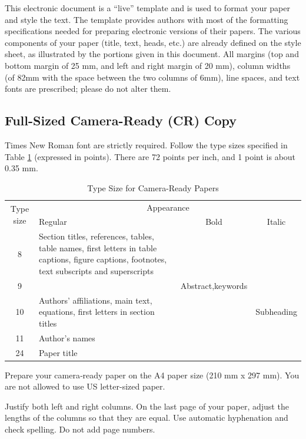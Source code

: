 \documentclass{MIPRO}
\begin{document}
This electronic document is a “live” template and is used to format your paper and style the text. The template provides authors with most of the formatting specifications needed for preparing electronic versions of their papers. The various components of your paper (title, text, heads, etc.) are already defined on the style sheet, as illustrated by the portions given in this document. All margins (top and bottom margin of 25 mm, and left and right margin of 20 mm), column widths (of 82mm with the space between the two columns of 6mm), line spaces, and text fonts are prescribed; please do not alter them.

\subsection{Full-Sized Camera-Ready (CR) Copy}

Times New Roman font are strictly required. Follow the type sizes specified in Table \ref{type_sizes} (expressed in points). There are 72 points per inch, and 1 point is about 0.35 mm.

\begin{table}[h]
\caption{Type Size for Camera-Ready Papers}
\label{type_sizes}
\centering
\begin{tabular}{|c|p{10em}|c|c|} 
 \hline
 \multirow{2}{*}{Type size} & \multicolumn{3}{|c|}{Appearance} \\
 \cline{2-4}
 & Regular & Bold & Italic \\
 \hline\hline
 8 & Section titles, references, tables, table names, first letters in table captions, figure captions, footnotes, text subscripts and superscripts &  &  \\ 
 \hline
 9 &  & Abstract,keywords & \\
 \hline
 10 & Authors’ affiliations, main text, equations, first letters in section titles & & Subheading \\
 \hline
 11 & Author's names & & \\
 \hline
 24 & Paper title & & \\ 
 \hline
\end{tabular}
\end{table}

Prepare your camera‑ready paper on the A4 paper size (210 mm x 297 mm). You are not allowed to use US letter-sized paper.

Justify both left and right columns. On the last page of your paper, adjust the lengths of the columns so that they are equal. Use automatic hyphenation and check spelling. Do not add page numbers.
\end{document}
